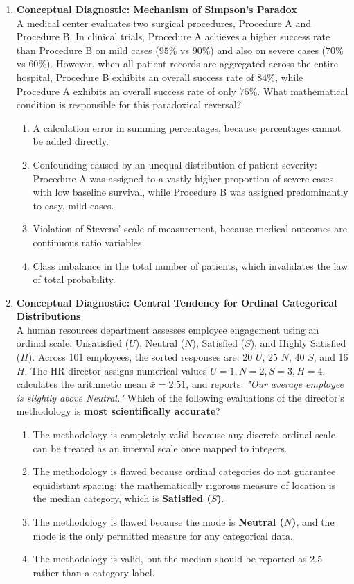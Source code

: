 \begin{enumerate}[resume]
\item \textbf{Conceptual Diagnostic: Mechanism of Simpson's Paradox} \\
A medical center evaluates two surgical procedures, Procedure A and Procedure B. In clinical trials, Procedure A achieves a higher success rate than Procedure B on mild cases ($95\%$ vs $90\%$) and also on severe cases ($70\%$ vs $60\%$). However, when all patient records are aggregated across the entire hospital, Procedure B exhibits an overall success rate of $84\%$, while Procedure A exhibits an overall success rate of only $75\%$. What mathematical condition is responsible for this paradoxical reversal?
\begin{enumerate}
    \item A calculation error in summing percentages, because percentages cannot be added directly.
    \item Confounding caused by an unequal distribution of patient severity: Procedure A was assigned to a vastly higher proportion of severe cases with low baseline survival, while Procedure B was assigned predominantly to easy, mild cases.
    \item Violation of Stevens' scale of measurement, because medical outcomes are continuous ratio variables.
    \item Class imbalance in the total number of patients, which invalidates the law of total probability.
\end{enumerate}

\item \textbf{Conceptual Diagnostic: Central Tendency for Ordinal Categorical Distributions} \\
A human resources department assesses employee engagement using an ordinal scale: Unsatisfied ($U$), Neutral ($N$), Satisfied ($S$), and Highly Satisfied ($H$). Across 101 employees, the sorted responses are: 20 $U$, 25 $N$, 40 $S$, and 16 $H$. The HR director assigns numerical values $U=1, N=2, S=3, H=4$, calculates the arithmetic mean $\bar{x} = 2.51$, and reports: \textit{"Our average employee is slightly above Neutral."} Which of the following evaluations of the director's methodology is \textbf{most scientifically accurate}?
\begin{enumerate}
    \item The methodology is completely valid because any discrete ordinal scale can be treated as an interval scale once mapped to integers.
    \item The methodology is flawed because ordinal categories do not guarantee equidistant spacing; the mathematically rigorous measure of location is the median category, which is \textbf{Satisfied ($S$)}.
    \item The methodology is flawed because the mode is \textbf{Neutral ($N$)}, and the mode is the only permitted measure for any categorical data.
    \item The methodology is valid, but the median should be reported as $2.5$ rather than a category label.
\end{enumerate}
\end{enumerate}

